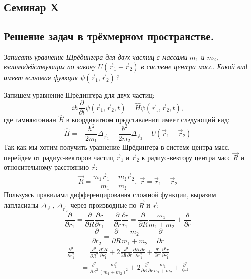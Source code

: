 \begin{center}
    \section{Семинар X}
\end{center}
\subsection{Решение задач в трёхмерном пространстве.}
\begin{center}
    \textit{Записать уравнение Шрёдингера для двух частиц с массами $m_1$ и $m_2$, взаимодействующих по закону $U(\Vec{r}_1 - \Vec{r}_2)$ в системе центра масс. Какой вид имеет волновая функция $\psi(\Vec{r}_1, \Vec{r}_2)$?}
\end{center}
Запишем уравнение Шрёдингера для двух частиц:
\[
i\hbar\frac{\partial}{\partial t}\psi(\Vec{r}_1, \Vec{r}_2, t) = \hat{H}\psi(\Vec{r}_1, \Vec{r}_2, t),
\]
где гамильтониан $\hat{H}$ в координатном представлении имеет следующий вид:
\[
\hat{H} = -\frac{\hbar^2}{2m_1}\Delta_{\Vec{r}_1} -\frac{\hbar^2}{2m_2}\Delta_{\Vec{r}_2} + U(\Vec{r}_1 - \Vec{r}_2)
\]
Так как мы хотим получить уравнение Шрёдингера в системе центра масс, перейдем от радиус-векторов частиц $\Vec{r}_1$ и $\Vec{r}_2$ к радиус-вектору центра масс $\Vec{R}$ и относительному расстоянию $\Vec{r}$:
\[
\Vec{R} = \frac{m_1\Vec{r}_1 + m_2\Vec{r}_2}{m_1 + m_2}, \; \Vec{r} = \Vec{r}_1 - \Vec{r}_2
\]
Пользуясь правилами дифференцирования сложной функции, выразим лапласианы $\Delta_{\Vec{r}_1}$, $\Delta_{\Vec{r}_2}$ через производные по $\Vec{R}$ и $\Vec{r}$:
\[
\frac{\partial}{\partial r_1} = \frac{\partial}{\partial R}\frac{\partial r}{\partial r_1} + \frac{\partial}{\partial r}\frac{\partial r}{r_1} = \frac{\partial}{\partial R}\frac{m_1}{m_1 + m_2} + \frac{\partial}{\partial r}
\]
\[
\frac{\partial}{\partial r_2} = \frac{\partial}{\partial R}\frac{m_2}{m_1 + m_2} - \frac{\partial}{\partial r}
\]
\begin{align*}
\frac{\partial^2}{\partial r_1^2} &= \frac{\partial^2}{\partial R^2} \frac{\partial^2 R}{\partial r_1^2} + 2\frac{\partial^2}{\partial R\,\partial r}\frac{\partial R\,\partial r}{\partial r_1^2} + \frac{\partial^2}{\partial r^2} \frac{\partial^2 r}{\partial r_1^2} = \\
&= \frac{\partial^2}{\partial R^2} \frac{m_1^2}{(m_1 + m_2)^2} + 2\frac{\partial^2}{\partial R\,\partial r}\frac{m_1}{m_1 + m_2} +  \frac{\partial^2}{\partial r^2}
\end{align*}
